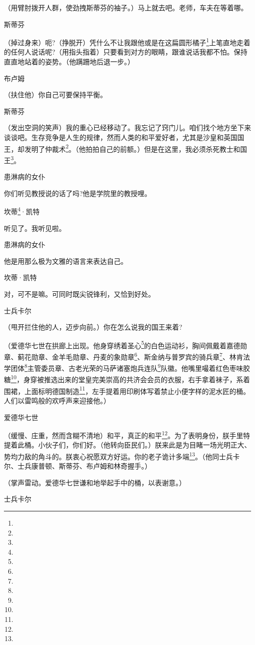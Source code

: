 \par （用臂肘拨开人群，使劲拽斯蒂芬的袖子。）马上就去吧。老师，车夫在等着哪。
\par 斯蒂芬
\par （掉过身来）呃?（挣脱开）凭什么不让我跟他或是在这扁圆形橘子\footnote{}上笔直地走着的任何人说话呢?（用指头指着）只要看到对方的眼睛，跟谁说话我都不怕。保持直直地站着的姿势。（他蹒跚地后退一步。）
\par 布卢姆
\par （扶住他）你自己可要保持平衡。
\par 斯蒂芬
\par （发出空洞的笑声）我的重心已经移动了。我忘记了窍门儿。咱们找个地方坐下来谈谈吧。生存竞争是人生的规律，然而人类的和平爱好者，尤其是沙皇和英国国王，却发明了仲裁术\footnote{}。（他拍拍自己的前额。）但是在这里，我必须杀死教士和国王\footnote{}。
\par 患淋病的女仆
\par 你们听见教授说的话了吗?他是学院里的教授哩。
\par 坎蒂\footnote{}·凯特
\par 听见了。我听见啦。
\par 患淋病的女仆
\par 他是用那么极为文雅的语言来表达自己。
\par 坎蒂·凯特
\par 对，可不是嘛。可同时既尖锐锋利，又恰到好处。
\par 士兵卡尔
\par （甩开拦住他的人，迈步向前。）你在怎么说我的国王来着?
\par （爱德华七世在拱廊上出现。他身穿绣着圣心\footnote{}的白色运动衫，胸间佩戴着嘉德勋章、蓟花勋章、金羊毛勋章、丹麦的象勋章\footnote{}、斯金纳与普罗宾的骑兵章\footnote{}、林肯法学团体\footnote{}主管委员章、古老光荣的马萨诸塞炮兵连队\footnote{}队徽。他嘴里嘬着红色枣味胶糖\footnote{}，身穿被推选出来的堂皇完美崇高的共济会会员的衣服，右手拿着袜子，系着围裙，上面标明德国制造\footnote{}，左手提着用印刷体写着禁止小便字样的泥水匠的桶。人们以雷鸣般的欢呼声来迎接他。）
\par 爱德华七世
\par （缓慢、庄重，然而含糊不清地）和平，真正的和平\footnote{}。为了表明身份，朕手里特提着此桶。小伙子们，你们好。（他转向臣民们。）朕来此是为目睹一场光明正大、势均力敌的角斗的。朕衷心祝愿双方好运。你的老子诡计多端\footnote{}。（他同士兵卡尔、士兵康普顿、斯蒂芬、布卢姆和林奇握手。）
\par （掌声雷动。爱德华七世谦和地举起手中的桶，以表谢意。）
\par 士兵卡尔
